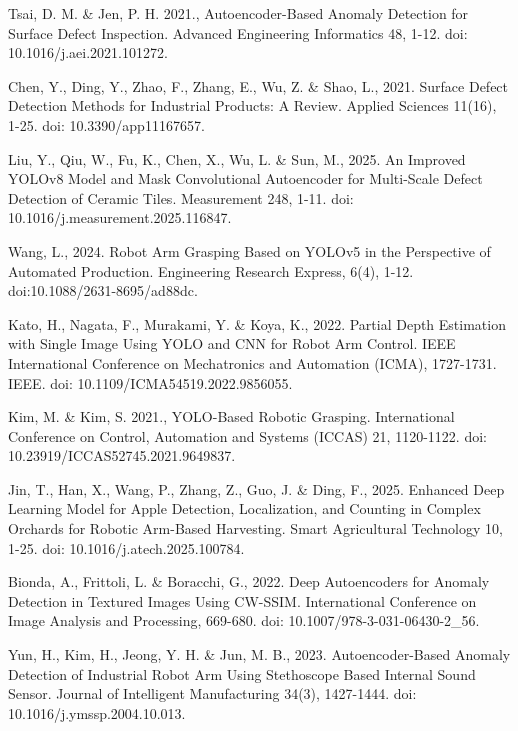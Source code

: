 \begin{thebibliography}{9}
  Tsai, D. M. \& Jen, P. H. 2021., Autoencoder-Based Anomaly Detection
  for Surface Defect Inspection. Advanced Engineering Informatics 48,
  1-12. doi: 10.1016/j.aei.2021.101272.

  Chen, Y., Ding, Y., Zhao, F., Zhang, E., Wu, Z. \& Shao, L., 2021.
  Surface Defect Detection Methods for Industrial Products: A Review.
  Applied Sciences 11(16), 1-25. doi: 10.3390/app11167657.

  Liu, Y., Qiu, W., Fu, K., Chen, X., Wu, L. \& Sun, M., 2025. An
  Improved YOLOv8 Model and Mask Convolutional Autoencoder for
  Multi-Scale Defect Detection of Ceramic Tiles. Measurement 248,
  1-11. doi: 10.1016/j.measurement.2025.116847.

  Wang, L., 2024. Robot Arm Grasping Based on YOLOv5 in the
  Perspective of Automated Production. Engineering Research Express,
  6(4), 1-12. doi:10.1088/2631-8695/ad88dc.

  Kato, H., Nagata, F., Murakami, Y. \& Koya, K., 2022. Partial Depth
  Estimation with Single Image Using YOLO and CNN for Robot Arm
  Control. IEEE International Conference on Mechatronics and
  Automation (ICMA), 1727-1731. IEEE. doi: 10.1109/ICMA54519.2022.9856055.

  Kim, M. \& Kim, S. 2021., YOLO-Based Robotic Grasping. International
  Conference on Control, Automation and
  Systems (ICCAS) 21, 1120-1122. doi: 10.23919/ICCAS52745.2021.9649837.

  Jin, T., Han, X., Wang, P., Zhang, Z., Guo, J. \& Ding, F., 2025.
  Enhanced Deep Learning Model for Apple Detection, Localization, and
  Counting in Complex Orchards for Robotic Arm-Based Harvesting.
  Smart Agricultural Technology 10, 1-25. doi: 10.1016/j.atech.2025.100784.

  Bionda, A., Frittoli, L. \& Boracchi, G., 2022. Deep
  Autoencoders for Anomaly Detection in Textured Images Using
  CW-SSIM. International Conference on Image Analysis and
  Processing, 669-680. doi: 10.1007/978-3-031-06430-2\_56.

  Yun, H., Kim, H., Jeong, Y. H. \& Jun, M. B., 2023.
  Autoencoder-Based Anomaly Detection of Industrial Robot Arm Using
  Stethoscope Based Internal Sound Sensor. Journal of Intelligent
  Manufacturing 34(3), 1427-1444. doi: 10.1016/j.ymssp.2004.10.013.


\end{thebibliography}
